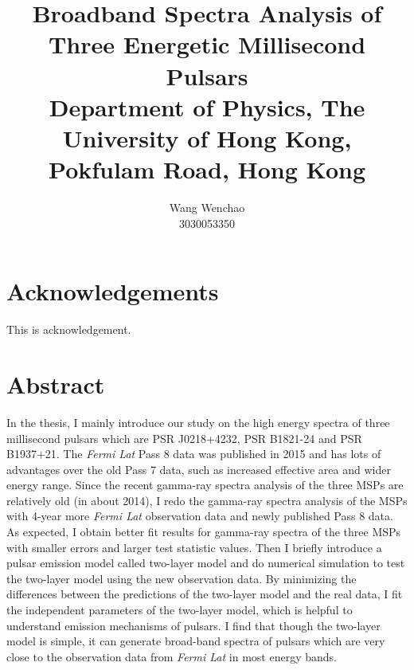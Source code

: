 \documentclass[12pt]{report}
\title{\textbf{Broadband Spectra Analysis of Three Energetic Millisecond Pulsars}\\ \vspace{1cm}
			{\large Department of Physics, The University of Hong Kong, Pokfulam Road, Hong Kong}\\ \vspace{1cm}
}
\date{}
\author{Wang Wenchao  \\3030053350}
\begin{document}
\maketitle



\cleardoublepage
{}
\chapter*{Acknowledgements}
  This is acknowledgement. 
  

\cleardoublepage
{}
\chapter*{Abstract}
  \doublespacing
  In the thesis, I mainly introduce our study on the high energy spectra of three 
  millisecond pulsars which are PSR J0218+4232, PSR B1821-24 and PSR B1937+21. 
  The \textit{Fermi Lat} Pass 8 data was published in 2015 and has lots of advantages over 
  the old Pass 7 data, such as increased effective area and wider energy range. Since 
  the recent gamma-ray spectra analysis of the three MSPs are relatively old (in about 2014), 
  I redo the gamma-ray spectra analysis of the MSPs with 
  4-year more \textit{Fermi Lat} observation data and newly published Pass 8 data. 
  As expected, I obtain better fit results for gamma-ray spectra of 
  the three MSPs with smaller errors and larger test statistic values. Then I briefly 
  introduce a pulsar emission model called two-layer model \cite{0004-637X-787-2-167} and 
  do numerical simulation to test the two-layer model using the new observation data.
  By minimizing the differences between the predictions of the two-layer model and the real 
  data, I fit the independent parameters of the two-layer model, which is helpful to
  understand emission mechanisms of pulsars. I find that though the two-layer model is 
  simple, it can generate broad-band spectra of pulsars which are very close to the 
  observation data from \textit{Fermi Lat} in most energy bands.
			
\cleardoublepage
{}
\newpage

\cleardoublepage
{}

\tableofcontents


\listoffigures
\end{document}
